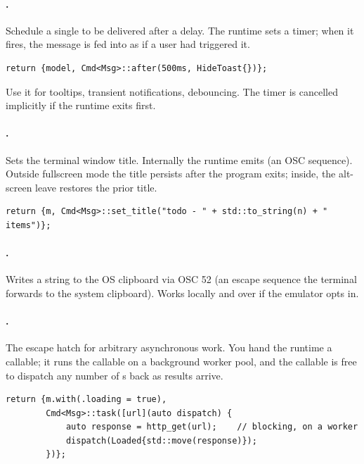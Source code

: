 \paragraph{.} Schedule a single  to be
delivered after a delay. The runtime sets a timer; when it fires,
the message is fed into  as if a user had triggered it.

\begin{lstlisting}
return {model, Cmd<Msg>::after(500ms, HideToast{})};
\end{lstlisting}

Use it for tooltips, transient notifications, debouncing. The timer
is cancelled implicitly if the runtime exits first.

\paragraph{.} Sets the terminal window title.
Internally the runtime emits \code{ESC \textbackslash{}"]0;\dots\textbackslash{}"a}
(an OSC sequence). Outside fullscreen mode the title persists after
the program exits; inside, the alt-screen leave restores the prior
title.

\begin{lstlisting}
return {m, Cmd<Msg>::set_title("todo - " + std::to_string(n) + " items")};
\end{lstlisting}

\paragraph{.} Writes a string to the OS
clipboard via OSC 52 (an escape sequence the terminal forwards to
the system clipboard). Works locally and over  if the
emulator opts in.

\paragraph{.} The escape hatch for arbitrary asynchronous
work. You hand the runtime a callable; it runs the callable on a
background worker pool, and the callable is free to dispatch any
number of s back as results arrive.

\begin{lstlisting}
return {m.with(.loading = true),
        Cmd<Msg>::task([url](auto dispatch) {
            auto response = http_get(url);    // blocking, on a worker
            dispatch(Loaded{std::move(response)});
        })};
\end{lstlisting}

